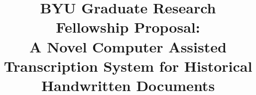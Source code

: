 \documentclass[conference]{IEEEtran}
\begin{document}
%
\title{BYU Graduate Research Fellowship Proposal:\\A Novel Computer Assisted Transcription System for Historical Handwritten Documents}


\author{
}


% 




\end{document}
